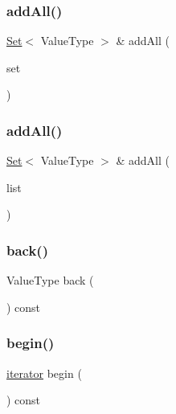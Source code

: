 \subsubsection{\texorpdfstring{add\+All()}{addAll()}\hspace{0.1cm}{\footnotesize\ttfamily [1/2]}}
{\footnotesize\ttfamily \mbox{\hyperlink{classSet}{Set}}$<$ Value\+Type $>$ \& add\+All (\begin{DoxyParamCaption}\item[{const \mbox{\hyperlink{classSet}{Set}}$<$ Value\+Type $>$ \&}]{set }\end{DoxyParamCaption})}

\mbox{\label{classSet_ae6a0476359bb28804a59192164171cb8}} 
\subsubsection{\texorpdfstring{add\+All()}{addAll()}\hspace{0.1cm}{\footnotesize\ttfamily [2/2]}}
{\footnotesize\ttfamily \mbox{\hyperlink{classSet}{Set}}$<$ Value\+Type $>$ \& add\+All (\begin{DoxyParamCaption}\item[{std\+::initializer\+\_\+list$<$ Value\+Type $>$}]{list }\end{DoxyParamCaption})}

\mbox{\label{classSet_a38cbd80c93f450dc9bf3ca7c6a6220bd}} 
\subsubsection{\texorpdfstring{back()}{back()}}
{\footnotesize\ttfamily Value\+Type back (\begin{DoxyParamCaption}{ }\end{DoxyParamCaption}) const}

\mbox{\label{classSet_a0c62c15c8ed609e7e5e9518cf5f5c712}} 
\subsubsection{\texorpdfstring{begin()}{begin()}}
{\footnotesize\ttfamily \mbox{\hyperlink{classSet_1_1iterator}{iterator}} begin (\begin{DoxyParamCaption}{ }\end{DoxyParamCaption}) const\hspace{0.3cm}{\ttfamily [inline]}}

